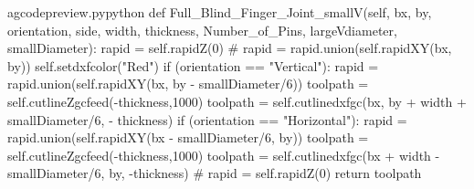 \documentclass{ltxdoc}
\begin{document}
\begin{writecode}{a}{gcodepreview.py}{python}
    def Full_Blind_Finger_Joint_smallV(self, bx, by, orientation, side, width, thickness, Number_of_Pins, largeVdiameter, smallDiameter):
        rapid = self.rapidZ(0)
#        rapid = rapid.union(self.rapidXY(bx, by))
        self.setdxfcolor("Red")
        if (orientation == "Vertical"):
            rapid = rapid.union(self.rapidXY(bx, by - smallDiameter/6))
            toolpath = self.cutlineZgcfeed(-thickness,1000)
            toolpath = self.cutlinedxfgc(bx, by + width + smallDiameter/6, - thickness)
        if (orientation == "Horizontal"):
            rapid = rapid.union(self.rapidXY(bx - smallDiameter/6, by))
            toolpath = self.cutlineZgcfeed(-thickness,1000)
            toolpath = self.cutlinedxfgc(bx + width - smallDiameter/6, by, -thickness)
#            rapid = self.rapidZ(0)  
        return toolpath


\end{writecode}
\end{document}
